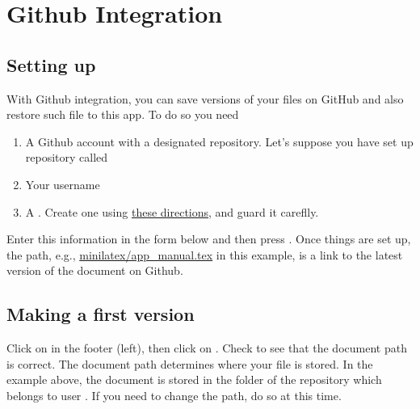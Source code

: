 \section{Github Integration}

\subsection{Setting up}

With Github integration, you can save versions of your files on GitHub and also restore such file to this app.  To do so you need

\begin{enumerate}

\item A Github account with a designated repository.  Let's suppose you have set up  repository called 

\item Your username

\item A  .  Create one using \href{https://docs.github.com/en/free-pro-team@latest/github/authenticating-to-github/creating-a-personal-access-token}{these directions}, and guard it careflly.

\end{enumerate}

Enter this information in the form below and then press .  Once things are set up, the path, e.g., \href{https://github.com/jxxcarlson/minilatex-docs/blob/master/minilatex/app_manual.tex}{minilatex/app_manual.tex} in this example, is a link to the latest version of the document on Github.




\subsection{Making a first version}

Click on  in the footer (left), then click on .  Check to see that the document path is correct.  The document path determines where your file is stored.  In the example above, the document  is stored in the folder  of the repository   which belongs to user .  If you need to change the path, do so at this time.

